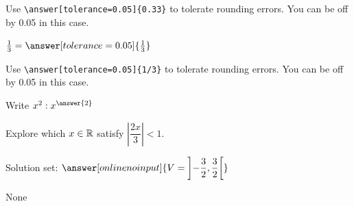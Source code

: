 \documentclass{ximera}
\begin{document}
\begin{exercise}
\begin{question}
            Use \verb|\answer[tolerance=0.05]{0.33}| to tolerate rounding errors. You can be off by 0.05 in this case.
        \end{question}

        \begin{question}
            $\frac{1}{3} =  \answer[tolerance=0.05]{\frac{1}{3}}$  

            Use \verb|\answer[tolerance=0.05]{1/3}| to tolerate rounding errors. You can be off by 0.05 in this case.
        \end{question}




        \begin{question} Write $x^2: x^{\answer{2}}$
        \end{question}


    \end{exercise}

    \begin{example} Explore which $x\in \mathbb{R}$ satisfy $\left|\dfrac{2x}{3}\right|<1$.

        Solution set: $\answer[onlinenoinput]{\displaystyle
            V=\left]-\frac{3}{2},\frac{3}{2}\right[}$
        \begin{oplossing}
            None
        \end{oplossing}
    \end{example}
\end{document}
